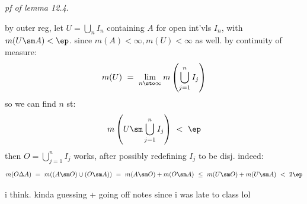 \textit{pf of lemma 12.4}.

by outer reg, let $U=\bigcup_{n}I_{n}$ containing $A$ for open int'vls $I_{n}$,
with $m(U\sm A)<\ep$. since $m(A)<\infty,m(U)<\infty$ as well.
by continuity of measure:
\begin{equation*}
	m(U) \ = \ \lim_{n\sto\infty}m\left(\bigcup_{j=1}^{n}I_{j}\right)
\end{equation*}
so we can find $n$ st:
\begin{equation*}
	m\left(U\sm \bigcup_{j=1}^{n}I_{j}\right) \ < \ \ep
\end{equation*}
then $O=\bigcup_{j=1}^{n}I_{j}$ works, after possibly redefining $I_{j}$ to be disj.
indeed:
\begin{equation*}
	m(O\Delta A) \ = \ m((A\sm O)\cup(O\sm A))
	\ = \ m(A\sm O) + m(O\sm A)
	\ \leq \ m(U\sm O) + m(U\sm A) \ < \ 2\ep
\end{equation*}

i think. kinda guessing + going off notes since i was late to class lol
